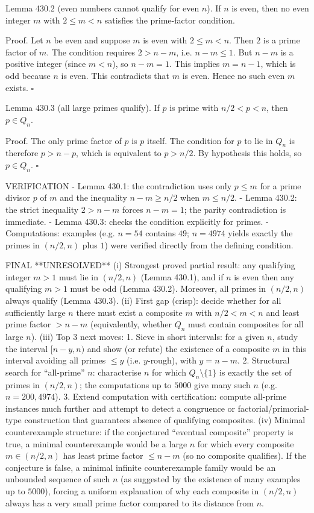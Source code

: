 Lemma 430.2 (even numbers cannot qualify for even $n$).
If $n$ is even, then no even integer $m$ with $2\le m<n$ satisfies the prime-factor condition.

Proof.
Let $n$ be even and suppose $m$ is even with $2\le m<n$.
Then $2$ is a prime factor of $m$. The condition requires $2>n-m$, i.e. $n-m\le 1$.
But $n-m$ is a positive integer (since $m<n$), so $n-m=1$.
This implies $m=n-1$, which is odd because $n$ is even. This contradicts that $m$ is even.
Hence no such even $m$ exists.
\hfill $\square$

Lemma 430.3 (all large primes qualify).
If $p$ is prime with $n/2<p<n$, then $p\in Q_n$.

Proof.
The only prime factor of $p$ is $p$ itself. The condition for $p$ to lie in $Q_n$ is therefore $p>n-p$, which is equivalent to $p>n/2$.
By hypothesis this holds, so $p\in Q_n$.
\hfill $\square$

VERIFICATION
- Lemma 430.1: the contradiction uses only $p\le m$ for a prime divisor $p$ of $m$ and the inequality $n-m\ge n/2$ when $m\le n/2$.
- Lemma 430.2: the strict inequality $2>n-m$ forces $n-m=1$; the parity contradiction is immediate.
- Lemma 430.3: checks the condition explicitly for primes.
- Computations: examples (e.g. $n=54$ contains $49$; $n=4974$ yields exactly the primes in $(n/2,n)$ plus $1$) were verified directly from the defining condition.

FINAL
**UNRESOLVED**
(i) Strongest proved partial result: any qualifying integer $m>1$ must lie in $(n/2,n)$ (Lemma 430.1), and if $n$ is even then any qualifying $m>1$ must be odd (Lemma 430.2). Moreover, all primes in $(n/2,n)$ always qualify (Lemma 430.3).
(ii) First gap (crisp): decide whether for all sufficiently large $n$ there must exist a composite $m$ with $n/2<m<n$ and least prime factor $>n-m$ (equivalently, whether $Q_n$ must contain composites for all large $n$).
(iii) Top 3 next moves:
  1. Sieve in short intervals: for a given $n$, study the interval $[n-y,n)$ and show (or refute) the existence of a composite $m$ in this interval avoiding all primes $\le y$ (i.e. $y$-rough), with $y=n-m$.
  2. Structural search for “all-prime” $n$: characterise $n$ for which $Q_n\setminus\{1\}$ is exactly the set of primes in $(n/2,n)$; the computations up to $5000$ give many such $n$ (e.g. $n=200,4974$).
  3. Extend computation with certification: compute all-prime instances much further and attempt to detect a congruence or factorial/primorial-type construction that guarantees absence of qualifying composites.
(iv) Minimal counterexample structure: if the conjectured “eventual composite” property is true, a minimal counterexample would be a large $n$ for which every composite $m\in(n/2,n)$ has least prime factor $\le n-m$ (so no composite qualifies). If the conjecture is false, a minimal infinite counterexample family would be an unbounded sequence of such $n$ (as suggested by the existence of many examples up to $5000$), forcing a uniform explanation of why each composite in $(n/2,n)$ always has a very small prime factor compared to its distance from $n$.

